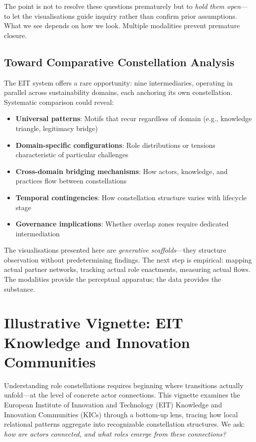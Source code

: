 The point is not to resolve these questions prematurely but to \textit{hold them open}---to let the visualisations guide inquiry rather than confirm prior assumptions. What we see depends on how we look. Multiple modalities prevent premature closure.

\subsection{Toward Comparative Constellation Analysis}

The EIT system offers a rare opportunity: nine intermediaries, operating in parallel across sustainability domains, each anchoring its own constellation. Systematic comparison could reveal:

\begin{itemize}[noitemsep,topsep=2pt]
    \item \textbf{Universal patterns}: Motifs that recur regardless of domain (e.g., knowledge triangle, legitimacy bridge)
    \item \textbf{Domain-specific configurations}: Role distributions or tensions characteristic of particular challenges
    \item \textbf{Cross-domain bridging mechanisms}: How actors, knowledge, and practices flow between constellations
    \item \textbf{Temporal contingencies}: How constellation structure varies with lifecycle stage
    \item \textbf{Governance implications}: Whether overlap zones require dedicated intermediation
\end{itemize}

The visualisations presented here are \textit{generative scaffolds}---they structure observation without predetermining findings. The next step is empirical: mapping actual partner networks, tracking actual role enactments, measuring actual flows. The modalities provide the perceptual apparatus; the data provides the substance.

\section{Illustrative Vignette: EIT Knowledge and Innovation Communities}
\label{sec:vignette}

Understanding role constellations requires beginning where transitions actually unfold---at the level of concrete actor connections. This vignette examines the European Institute of Innovation and Technology (EIT) Knowledge and Innovation Communities (KICs) through a bottom-up lens, tracing how local relational patterns aggregate into recognizable constellation structures. We ask: \textit{how are actors connected, and what roles emerge from these connections?}

